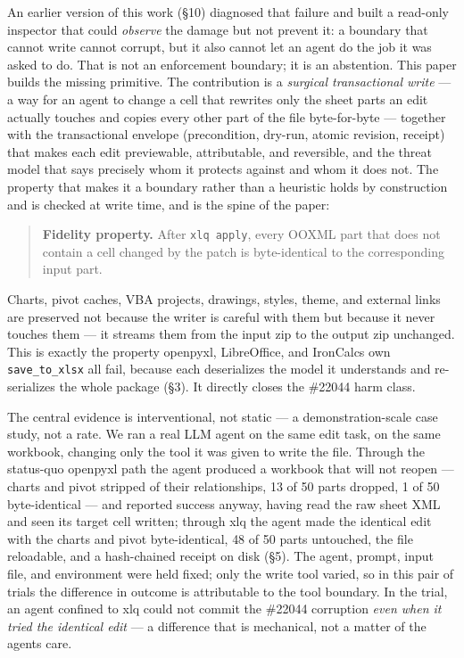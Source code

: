 \documentclass[
]{article}
\begin{document}
An earlier version of this work (§10) diagnosed that failure and built a
read-only inspector that could \emph{observe} the damage but not prevent
it: a boundary that cannot write cannot corrupt, but it also cannot let
an agent do the job it was asked to do. That is not an enforcement
boundary; it is an abstention. This paper builds the missing primitive.
The contribution is a \emph{surgical transactional write} --- a way for
an agent to change a cell that rewrites only the sheet parts an edit
actually touches and copies every other part of the file byte-for-byte
--- together with the transactional envelope (precondition, dry-run,
atomic revision, receipt) that makes each edit previewable,
attributable, and reversible, and the threat model that says precisely
whom it protects against and whom it does not. The property that makes
it a boundary rather than a heuristic holds by construction and is
checked at write time, and is the spine of the paper:

\begin{quote}
\textbf{Fidelity property.} After \texttt{xlq\ apply}, every OOXML part
that does not contain a cell changed by the patch is byte-identical to
the corresponding input part.
\end{quote}

Charts, pivot caches, VBA projects, drawings, styles, theme, and
external links are preserved not because the writer is careful with them
but because it never touches them --- it streams them from the input zip
to the output zip unchanged. This is exactly the property openpyxl,
LibreOffice, and IronCalc\textquotesingle s own \texttt{save\_to\_xlsx}
all fail, because each deserializes the model it understands and
re-serializes the whole package (§3). It directly closes the \#22044
harm class.

The central evidence is interventional, not static --- a
demonstration-scale case study, not a rate. We ran a real LLM agent on
the same edit task, on the same workbook, changing only the tool it was
given to write the file. Through the status-quo openpyxl path the agent
produced a workbook that will not reopen --- charts and pivot stripped
of their relationships, 13 of 50 parts dropped, 1 of 50 byte-identical
--- and reported success anyway, having read the raw sheet XML and seen
its target cell written; through xlq the agent made the identical edit
with the charts and pivot byte-identical, 48 of 50 parts untouched, the
file reloadable, and a hash-chained receipt on disk (§5). The agent,
prompt, input file, and environment were held fixed; only the write tool
varied, so in this pair of trials the difference in outcome is
attributable to the tool boundary. In the trial, an agent confined to
xlq could not commit the \#22044 corruption \emph{even when it tried the
identical edit} --- a difference that is mechanical, not a matter of the
agent\textquotesingle s care.
\end{document}

